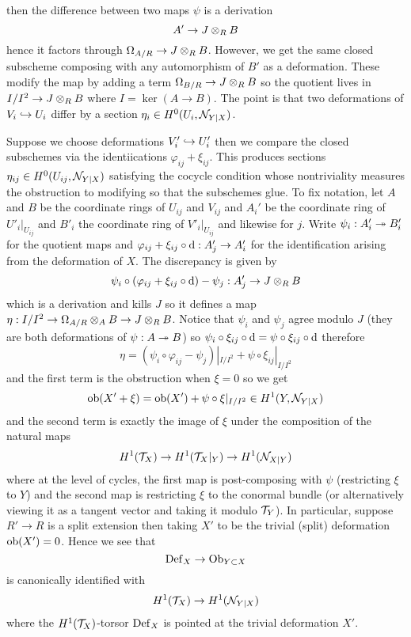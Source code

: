 \documentclass[12pt]{article}
\begin{document}
then the difference between two maps $\psi$ is a derivation
\[ A' \to J \otimes_R B \]
hence it factors through $\Omega_{A/R} \to J \otimes_R B$. However, we get the same closed subscheme composing with any automorphism of $B'$ as a deformation. These modify the map by adding a term $\Omega_{B/R} \to J \otimes_R B$ so the quotient lives in $I/I^2 \to J \otimes_R B$ where $I = \ker{(A \to B)}$. The point is that two deformations of $V_i \hookrightarrow U_i$ differ by a section $\eta_i \in H^0(U_i, \mathcal{N}_{Y|X})$. 
\par 
Suppose we choose deformations $V_i' \hookrightarrow U_i'$ then we compare the closed subschemes via the identiications $\varphi_{ij} + \xi_{ij}$. This produces sections $\eta_{ij} \in H^0(U_{ij}, \mathcal{N}_{Y|X})$ satisfying the cocycle condition whose nontriviality measures the obstruction to modifying so that the subschemes glue. To fix notation, let $A$ and $B$ be the coordinate rings of $U_{ij}$ and $V_{ij}$ and $A_i'$ be the coordinate ring of $U'_i|_{U_{ij}}$ and $B'_i$ the coordinate ring of $V'_i|_{U_{ij}}$ and likewise for $j$. Write $\psi_i : A_i' \twoheadrightarrow B_i'$ for the quotient maps and $\varphi_{ij} + \xi_{ij} \circ \mathrm{d} : A_j' \to A_i'$ for the identification arising from the deformation of $X$. The discrepancy is given by
\[ \psi_i \circ (\varphi_{ij} + \xi_{ij} \circ \mathrm{d}) - \psi_j : A'_j \to J \otimes_R B \]
which is a derivation and kills $J$ so it defines a map $\eta : I/I^2 \to \Omega_{A/R} \otimes_A B \to J \otimes_R B$. Notice that $\psi_i$ and $\psi_j$ agree modulo $J$ (they are both deformations of $\psi : A \twoheadrightarrow B$) so $\psi_i \circ \xi_{ij} \circ \mathrm{d} = \psi \circ \xi_{ij} \circ \mathrm{d}$ therefore
\[ \eta = (\psi_i \circ \varphi_{ij} - \psi_j)|_{I/I^2} + \psi \circ \xi_{ij}|_{I/I^2} \]  
and the first term is the obstruction when $\xi = 0$ so we get
\[ \mathrm{ob}(X' + \xi) = \mathrm{ob}(X') + \psi \circ \xi |_{I/I^2} \in H^1(Y, \mathcal{N}_{Y|X}) \]
and the second term is exactly the image of $\xi$ under the composition of the natural maps
\[ H^1(\mathcal{T}_X) \to H^1(\mathcal{T}_X|_Y) \to H^1(\mathcal{N}_{X|Y}) \]
where at the level of \cech cycles, the first map is post-composing with $\psi$ (restricting $\xi$ to $Y$) and the second map is restricting $\xi$ to the conormal bundle (or alternatively viewing it as a tangent vector and taking it modulo $\mathcal{T}_Y$). In particular, suppose $R' \to R$ is a split extension then taking $X'$ to be the trivial (split) deformation $\mathrm{ob}(X') = 0$. Hence we see that
\[ \mathrm{Def}_X \to \mathrm{Ob}_{Y \subset X} \]
is canonically identified with
\[ H^1(\mathcal{T}_X) \to H^1(\mathcal{N}_{Y|X}) \]
where the $H^1(\mathcal{T}_X)$-torsor $\mathrm{Def}_X$ is pointed at the trivial deformation $X'$.
\end{document}
